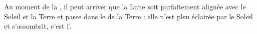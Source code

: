 \begin{mybilan}
	
		Au moment de la , il peut arriver que la Lune soit parfaitement alignée avec le Soleil et la Terre et passe dans le  de la Terre : elle n'est plsu éclairée par le Soleil et s'assombrit, c'est l'.

\end{mybilan}
